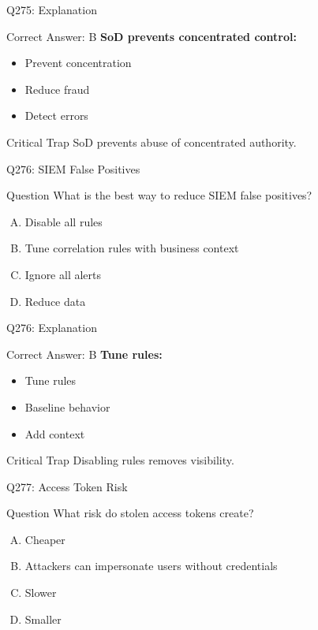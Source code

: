 \documentclass{beamer}
\begin{document}
	\begin{frame}{Q275: Explanation}
		\begin{block}{Correct Answer: B}
			\textbf{SoD prevents concentrated control:}
			\begin{itemize}
				\item Prevent concentration
				\item Reduce fraud
				\item Detect errors
			\end{itemize}
		\end{block}
		\begin{alertblock}{Critical Trap}
			SoD prevents abuse of concentrated authority.
		\end{alertblock}
	\end{frame}
	
	\begin{frame}{Q276: SIEM False Positives}
		\begin{block}{Question}
			What is the best way to reduce SIEM false positives?
		\end{block}
		\begin{enumerate}[(A)]
			\item Disable all rules
			\item Tune correlation rules with business context
			\item Ignore all alerts
			\item Reduce data
		\end{enumerate}
	\end{frame}
	
	\begin{frame}{Q276: Explanation}
		\begin{block}{Correct Answer: B}
			\textbf{Tune rules:}
			\begin{itemize}
				\item Tune rules
				\item Baseline behavior
				\item Add context
			\end{itemize}
		\end{block}
		\begin{alertblock}{Critical Trap}
			Disabling rules removes visibility.
		\end{alertblock}
	\end{frame}
	
	\begin{frame}{Q277: Access Token Risk}
		\begin{block}{Question}
			What risk do stolen access tokens create?
		\end{block}
		\begin{enumerate}[(A)]
			\item Cheaper
			\item Attackers can impersonate users without credentials
			\item Slower
			\item Smaller
		\end{enumerate}
	\end{frame}
	
\end{document}
